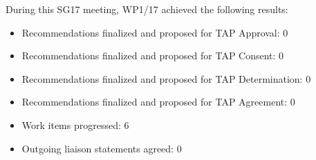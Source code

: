 During this SG17 meeting, WP1/17 achieved the following results:

\begin{itemize}
  \item Recommendations finalized and proposed for TAP Approval: 0
  \item Recommendations finalized and proposed for TAP Consent: 0
  \item Recommendations finalized and proposed for TAP Determination: 0
  \item Recommendations finalized and proposed for TAP Agreement: 0
  \item Work items progressed: 6
  \item Outgoing liaison statements agreed: 0
\end{itemize}